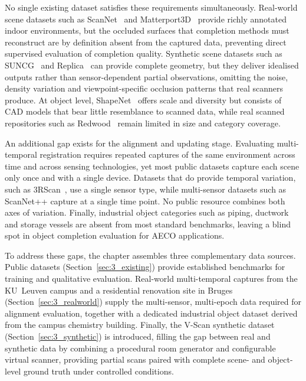 No single existing dataset satisfies these requirements simultaneously. Real-world scene datasets such as ScanNet~\cite{dai_scannet_2017} and Matterport3D~\cite{chang_matterport3d_2017} provide richly annotated indoor environments, but the occluded surfaces that completion methods must reconstruct are by definition absent from the captured data, preventing direct supervised evaluation of completion quality. Synthetic scene datasets such as SUNCG~\cite{song_semantic_2016} and Replica~\cite{straub_replica_2019} can provide complete geometry, but they deliver idealised outputs rather than sensor-dependent partial observations, omitting the noise, density variation and viewpoint-specific occlusion patterns that real scanners produce. At object level, ShapeNet~\cite{chang_shapenet_2015} offers scale and diversity but consists of CAD models that bear little resemblance to scanned data, while real scanned repositories such as Redwood~\cite{choi_large_2016} remain limited in size and category coverage.

An additional gap exists for the alignment and updating stage. Evaluating multi-temporal registration requires repeated captures of the same environment across time and across sensing technologies, yet most public datasets capture each scene only once and with a single device. Datasets that do provide temporal variation, such as 3RScan~\cite{wald_rio_2019}, use a single sensor type, while multi-sensor datasets such as ScanNet++ capture at a single time point. No public resource combines both axes of variation. Finally, industrial object categories such as piping, ductwork and storage vessels are absent from most standard benchmarks, leaving a blind spot in object completion evaluation for AECO applications.
 
To address these gaps, the chapter assembles three complementary data sources. Public datasets (Section~\ref{sec:3_existing}) provide established benchmarks for training and qualitative evaluation. Real-world multi-temporal captures from the KU~Leuven campus and a residential renovation site in Bruges (Section~\ref{sec:3_realworld}) supply the multi-sensor, multi-epoch data required for alignment evaluation, together with a dedicated industrial object dataset derived from the campus chemistry building. Finally, the V-Scan synthetic dataset (Section~\ref{sec:3_synthetic}) is introduced, filling the gap between real and synthetic data by combining a procedural room generator and configurable virtual scanner, providing partial scans paired with complete scene- and object-level ground truth under controlled conditions.
 

